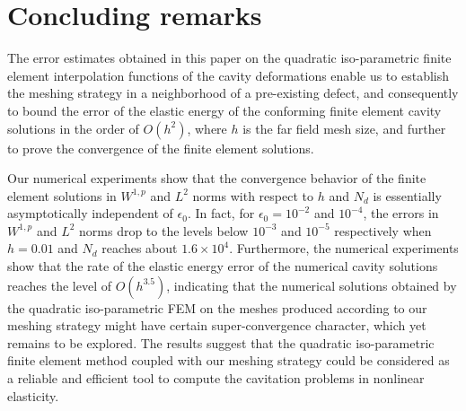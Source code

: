 \documentclass[12pt]{article}
\numberwithin{equation}{section}
\begin{document}
\section{Concluding remarks}

The error estimates obtained in this paper on the quadratic iso-parametric finite
element interpolation functions of the cavity deformations enable us to establish
the meshing strategy in a neighborhood of a pre-existing defect, and consequently
to bound the error of the elastic energy of the conforming finite element cavity
solutions in the order of $O(h^2)$, where $h$ is the
far field mesh size, and further to prove the convergence of the finite element
solutions.

Our numerical experiments show that the convergence behavior of the finite element
solutions in $W^{1,p}$ and $L^2$ norms with respect to $h$ and $N_d$ is
essentially asymptotically independent of $\epsilon_0$.
In fact, for $\epsilon_0=10^{-2}$ and $10^{-4}$, the errors in $W^{1,p}$ and
$L^2$ norms drop to the levels below $10^{-3}$ and $10^{-5}$
respectively when $h=0.01$ and $N_d$ reaches about $1.6 \times 10^4$.
Furthermore, the numerical experiments show that the rate of the elastic energy
error of the numerical cavity solutions reaches the level of $O(h^{3.5})$, indicating that
the numerical solutions obtained by the quadratic iso-parametric FEM on
the meshes produced according to our meshing strategy might
have certain super-convergence character, which yet remains to be explored.
The results suggest that the quadratic iso-parametric
finite element method coupled with our meshing strategy could be considered as a
reliable and efficient tool to compute the cavitation problems in nonlinear elasticity.
\end{document}
